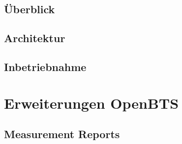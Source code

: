 


\subsection{Überblick}



\subsection{Architektur}



\subsection{Inbetriebnahme}



\section{Erweiterungen OpenBTS}



\subsection{Measurement Reports}



